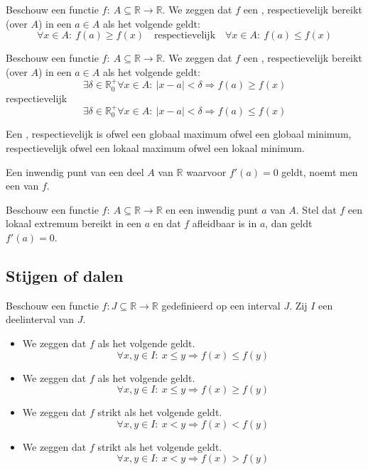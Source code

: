 \documentclass[main.tex]{subfiles}
\begin{document}
\begin{de}
  Beschouw een functie $f:\ A \subseteq \mathbb{R} \rightarrow \mathbb{R}$.
  We zeggen dat $f$ een , respectievelijk  bereikt (over $A$) in een $a\in A$ als het volgende geldt:
  \[ \forall x\in A:\ f(a) \ge f(x) \quad\text{respectievelijk}\quad \forall x\in A:\ f(a) \le f(x)\]
\end{de}

\begin{de}
  Beschouw een functie $f:\ A \subseteq \mathbb{R} \rightarrow \mathbb{R}$.
  We zeggen dat $f$ een , respectievelijk  bereikt (over $A$) in een $a\in A$ als het volgende geldt:
  \[ \exists \delta \in \mathbb{R}_{0}^{+}\forall x\in A:\ |x-a| < \delta \Rightarrow f(a) \ge f(x)\]
  respectievelijk
  \[ \exists \delta \in \mathbb{R}_{0}^{+}\forall x\in A:\ |x-a| < \delta \Rightarrow f(a) \le f(x)\]
\end{de}

\begin{de}
  Een , respectievelijk  is ofwel een globaal maximum ofwel een globaal minimum, respectievelijk ofwel een lokaal maximum ofwel een lokaal minimum.
\end{de}

\begin{de}
  Een inwendig punt van een deel $A$ van $\mathbb{R}$ waarvoor $f'(a)=0$ geldt, noemt men een  van $f$.
\end{de}

\begin{pr}
  Beschouw een functie $f:\ A \subseteq \mathbb{R} \rightarrow \mathbb{R}$ en een inwendig punt $a$ van $A$.
  Stel dat $f$ een lokaal extremum bereikt in een $a$ en dat $f$ afleidbaar is in $a$, dan geldt $f'(a) = 0$.
\end{pr}

\subsection{Stijgen of dalen}
\label{sec:stijgen-dalen}

\begin{de}
  Beschouw een functie $f: J \subseteq \mathbb{R} \rightarrow \mathbb{R}$ gedefinieerd op een interval $J$.
  Zij $I$ een deelinterval van $J$.
  \begin{itemize}
  \item We zeggen dat $f$  als het volgende geldt.
    \[ \forall x,y \in I:\ x \le y \Rightarrow f(x) \le f(y) \]
  \item We zeggen dat $f$  als het volgende geldt.
    \[ \forall x,y \in I:\ x \le y \Rightarrow f(x) \ge f(y) \]
  \item We zeggen dat $f$ strikt  als het volgende geldt.
    \[ \forall x,y \in I:\ x < y \Rightarrow f(x) < f(y) \]
  \item We zeggen dat $f$ strikt  als het volgende geldt.
    \[ \forall x,y \in I:\ x < y \Rightarrow f(x) > f(y) \]
  \end{itemize}
\end{de}
\end{document}
